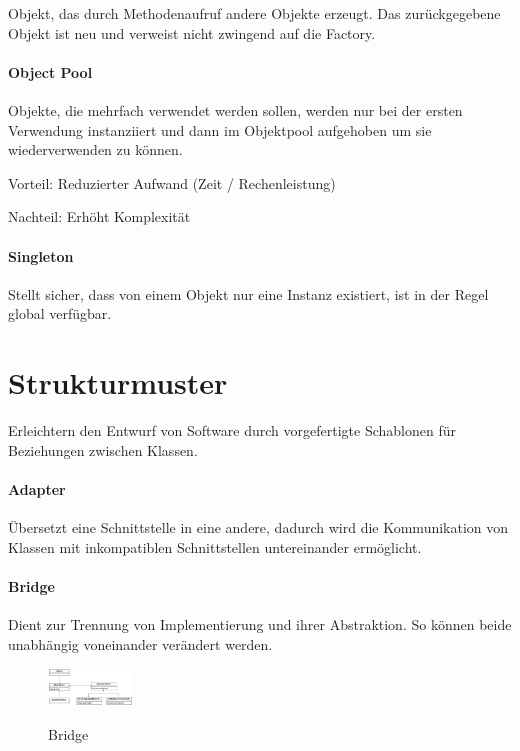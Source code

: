 Objekt, das durch Methodenaufruf andere Objekte erzeugt. Das zurückgegebene
Objekt ist neu und verweist nicht zwingend auf die Factory.

\paragraph{Object Pool}\label{object-pool}

Objekte, die mehrfach verwendet werden sollen, werden nur bei der ersten
Verwendung instanziiert und dann im Objektpool aufgehoben um sie
wiederverwenden zu können.

Vorteil: Reduzierter Aufwand (Zeit / Rechenleistung)

Nachteil: Erhöht Komplexität

\paragraph{Singleton}\label{singleton}

Stellt sicher, dass von einem Objekt nur eine Instanz existiert, ist in der
Regel global verfügbar.

\section{Strukturmuster}\label{strukturmuster}
Erleichtern den Entwurf von Software durch vorgefertigte Schablonen für
Beziehungen zwischen Klassen.

\paragraph{Adapter}\label{adapter}

Übersetzt eine Schnittstelle in eine andere, dadurch wird die Kommunikation von
Klassen mit inkompatiblen Schnittstellen untereinander ermöglicht.

\paragraph{Bridge}\label{bridge}

Dient zur Trennung von Implementierung und ihrer Abstraktion. So können beide
unabhängig voneinander verändert werden.
\begin{figure}[h]
	\begin{center}
		\includegraphics[width=0.2\textwidth]{images/bridge}
		\label{fig:bridge}
		\caption{Bridge}
	\end{center}
\end{figure}

